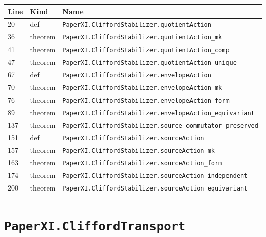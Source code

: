 \documentclass[10pt,oneside]{book}
\begin{document}
\begin{longtable}{@{}p{}p{}p{}@{}}\toprule Line&Kind&Name\\\midrule\endhead

20&def&\nolinkurl{PaperXI.CliffordStabilizer.quotientAction}\\

36&theorem&\nolinkurl{PaperXI.CliffordStabilizer.quotientAction_mk}\\

41&theorem&\nolinkurl{PaperXI.CliffordStabilizer.quotientAction_comp}\\

47&theorem&\nolinkurl{PaperXI.CliffordStabilizer.quotientAction_unique}\\

67&def&\nolinkurl{PaperXI.CliffordStabilizer.envelopeAction}\\

70&theorem&\nolinkurl{PaperXI.CliffordStabilizer.envelopeAction_mk}\\

76&theorem&\nolinkurl{PaperXI.CliffordStabilizer.envelopeAction_form}\\

89&theorem&\nolinkurl{PaperXI.CliffordStabilizer.envelopeAction_equivariant}\\

137&theorem&\nolinkurl{PaperXI.CliffordStabilizer.source_commutator_preserved}\\

151&def&\nolinkurl{PaperXI.CliffordStabilizer.sourceAction}\\

157&theorem&\nolinkurl{PaperXI.CliffordStabilizer.sourceAction_mk}\\

163&theorem&\nolinkurl{PaperXI.CliffordStabilizer.sourceAction_form}\\

174&theorem&\nolinkurl{PaperXI.CliffordStabilizer.sourceAction_independent}\\

200&theorem&\nolinkurl{PaperXI.CliffordStabilizer.sourceAction_equivariant}\\

\bottomrule\end{longtable}

\section{\texorpdfstring{\nolinkurl{PaperXI.CliffordTransport}}{PaperXI.CliffordTransport}}\label{module:PaperXI.CliffordTransport}
\end{document}
